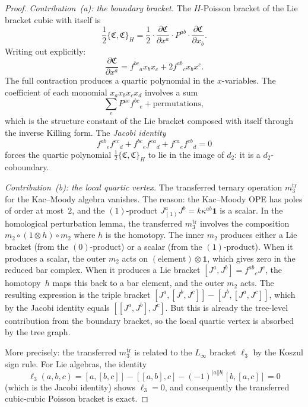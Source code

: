 \begin{proof}
\emph{Contribution~(a): the boundary bracket.}
The $H$-Poisson bracket of the Lie bracket cubic with
itself is
\begin{equation}\label{eq:km-boundary-bracket}
\frac{1}{2}\{\mathfrak{C}, \mathfrak{C}\}_H
= \frac{1}{2} \cdot
\frac{\partial \mathfrak{C}}{\partial x^a}
\cdot P^{ab} \cdot
\frac{\partial \mathfrak{C}}{\partial x_b}.
\end{equation}
Writing out explicitly:
\[
\frac{\partial \mathfrak{C}}{\partial x^a}
= f^{bc}{}_a x_b x_c + 2f^{ab}{}_c x_b x^c.
\]
The full contraction produces a quartic polynomial in
the $x$-variables. The coefficient of each monomial
$x_a x_b x_c x_d$ involves a sum
\[
\sum_e P^{ae}f^{bc}{}_e + \text{permutations},
\]
which is the structure constant of the Lie bracket
composed with itself through the inverse Killing form.
The \emph{Jacobi identity}
\begin{equation}\label{eq:jacobi-identity-structure-constants}
f^{ab}{}_e f^{ec}{}_d + f^{bc}{}_e f^{ea}{}_d
+ f^{ca}{}_e f^{eb}{}_d = 0
\end{equation}
forces the quartic polynomial
$\frac{1}{2}\{\mathfrak{C}, \mathfrak{C}\}_H$ to
lie in the image of $d_2$: it is a $d_2$-coboundary.

\emph{Contribution~(b): the local quartic vertex.}
The transferred ternary operation $m_3^{\mathrm{tr}}$
for the Kac--Moody algebra vanishes.
The reason: the Kac--Moody OPE has poles of order at
most~$2$, and the $(1)$-product
$J^a_{(1)}J^b = k\kappa^{ab}\mathbf{1}$ is a scalar.
In the homological perturbation lemma, the transferred
$m_3^{\mathrm{tr}}$ involves the composition
$m_2 \circ (1 \otimes h) \circ m_2$ where $h$ is the
homotopy. The inner $m_2$ produces either a Lie bracket
(from the $(0)$-product) or a scalar (from the
$(1)$-product). When it produces a scalar, the outer
$m_2$ acts on $(\text{element}) \otimes \mathbf{1}$, which
gives zero in the reduced bar complex. When it produces
a Lie bracket $[J^a, J^b] = f^{ab}{}_c J^c$, the homotopy~$h$
maps this back to a bar element, and the outer $m_2$
acts. The resulting expression is the triple bracket
$[J^a, [J^b, J^c]] - [J^b, [J^a, J^c]]$, which by
the Jacobi identity equals $[[J^a, J^b], J^c]$. But
this is already the tree-level contribution from the
boundary bracket, so the local quartic vertex is absorbed
by the tree graph.

More precisely: the transferred $m_3^{\mathrm{tr}}$ is
related to the $L_\infty$ bracket $\ell_3$ by the Koszul
sign rule. For Lie algebras, the identity
\begin{equation}\label{eq:ell3-jacobi-vanishing}
\ell_3(a, b, c) = [a, [b, c]] - [[a,b], c] - (-1)^{|a||b|}[b,[a,c]]
= 0
\end{equation}
(which is the Jacobi identity) shows $\ell_3 = 0$, and
consequently the transferred cubic-cubic Poisson bracket
is exact.


\end{proof}
